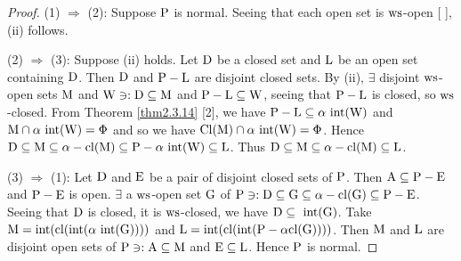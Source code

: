 \begin{proof}
(1) $\Rightarrow$ (2): Suppose $\mathrm{P}$ is normal. Seeing that each open set is $\mathrm{ws}$-open [ ], (ii) follows.

(2) $\Rightarrow$ (3): Suppose (ii) holds. Let $\mathrm{D}$ be a closed set and $\mathrm{L}$ be an open set containing $\mathrm{D}$. Then $\mathrm{D}$ and $\mathrm{P} -\mathrm{L}$ are disjoint closed sets. By (ii), $\exists$  disjoint $\mathrm{ws}$-open sets $\mathrm{M}$ and $\mathrm{W} \ni: \mathrm{D}\subseteq \mathrm{M}$ and $\mathrm{P}-\mathrm{L} \subseteq \mathrm{W}$, seeing that $\mathrm{P} -\mathrm{L}$ is closed, so $\mathrm{ws}$-closed. From Theorem \ref{thm2.3.14} [2], we have $\mathrm{P} -\mathrm{L} \subseteq \alpha\text{ int} (\mathrm{W})$ and $\mathrm{M} \cap \alpha\text{ int} (\mathrm{W}) = \Phi$ and so we have $\mathrm{Cl} (\mathrm{M}) \cap \alpha\text{ int} (\mathrm{W}) = \Phi$. Hence $\mathrm{D} \subseteq \mathrm{M} \subseteq \alpha-\mathrm{cl}(\mathrm{M}) \subseteq \mathrm{P} -\alpha\text{ int}(\mathrm{W}) \subseteq \mathrm{L}$. Thus $\mathrm{D}\subseteq\mathrm{M} \subseteq \alpha-\mathrm{cl} (\mathrm{M}) \subseteq \mathrm{L}$.

(3) $\Rightarrow$ (1): Let $\mathrm{D}$ and $\mathrm{E}$ be a pair of disjoint closed sets of $\mathrm{P}$. Then $\mathrm{A} \subseteq \mathrm{P}-\mathrm{E}$ and $\mathrm{P}-\mathrm{E}$ is open. $\exists$ a $\mathrm{ws}$-open set $\mathrm{G}$ of $\mathrm{P} \ni: \mathrm{D} \subseteq \mathrm{G} \subseteq \alpha-\mathrm{cl} (\mathrm{G}) \subseteq \mathrm{P}-\mathrm{E}$. Seeing that $\mathrm{D}$ is closed, it is $\mathrm{ws}$-closed, we have $\mathrm{D} \subseteq \text{ int} (\mathrm{G})$. Take $\mathrm{M} =\text{int} (\mathrm{cl} (\text{int} (\alpha\text{ int} (\mathrm{G}))))$ and $\mathrm{L} = \text{int} (\mathrm{cl} (\text{int}(\mathrm{P}-\alpha\mathrm{cl} (\mathrm{G}))))$. Then $\mathrm{M}$ and $\mathrm{L}$ are disjoint open sets of $\mathrm{P} \ni: \mathrm{A} \subseteq \mathrm{M}$ and $\mathrm{E} \subseteq \mathrm{L}$. Hence $\mathrm{P}$ is normal.
\end{proof}
